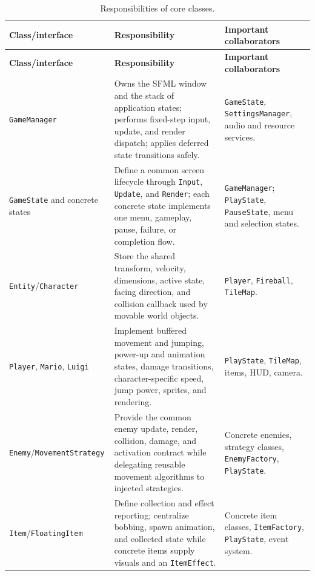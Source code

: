 \documentclass{template}
\begin{document}
{\small
\begin{longtable}{@{}>{\raggedright\arraybackslash}p{4.10cm}
                        >{\raggedright\arraybackslash}p{5.80cm}
                        >{\raggedright\arraybackslash}p{4.65cm}@{}}
    \caption{Responsibilities of core classes.}\label{tab:classes}\\
    \toprule
    \textbf{Class/interface} & \textbf{Responsibility} &
    \textbf{Important collaborators} \\
    \midrule
    \endfirsthead
    \toprule
    \textbf{Class/interface} & \textbf{Responsibility} &
    \textbf{Important collaborators} \\
    \midrule
    \endhead
    \texttt{GameManager} & Owns the SFML window and the stack of application
    states; performs fixed-step input, update, and render dispatch; applies
    deferred state transitions safely. & \texttt{GameState},
    \texttt{SettingsManager}, audio and resource services. \\
    \texttt{GameState} and concrete states & Define a common screen lifecycle
    through \texttt{Input}, \texttt{Update}, and \texttt{Render}; each concrete
    state implements one menu, gameplay, pause, failure, or completion flow. &
    \texttt{GameManager}; \texttt{PlayState}, \texttt{PauseState}, menu and
    selection states. \\
    \texttt{Entity}/\texttt{Character} & Store the shared transform, velocity,
    dimensions, active state, facing direction, and collision callback used by
    movable world objects. & \texttt{Player}, \texttt{Fireball},
    \texttt{TileMap}. \\
    \texttt{Player}, \texttt{Mario}, \texttt{Luigi} & Implement buffered
    movement and jumping, power-up and animation states, damage transitions,
    character-specific speed, jump power, sprites, and rendering. &
    \texttt{PlayState}, \texttt{TileMap}, items, HUD, camera. \\
    \texttt{Enemy}/\allowbreak\texttt{MovementStrategy} & Provide the common enemy
    update, render, collision, damage, and activation contract while delegating
    reusable movement algorithms to injected strategies. & Concrete enemies,
    strategy classes, \texttt{EnemyFactory}, \texttt{PlayState}. \\
    \texttt{Item}/\allowbreak\texttt{FloatingItem} & Define collection and effect
    reporting; centralize bobbing, spawn animation, and collected state while
    concrete items supply visuals and an \texttt{ItemEffect}. & Concrete item
    classes, \texttt{ItemFactory}, \texttt{PlayState}, event system. \\

\end{longtable}}
\end{document}
